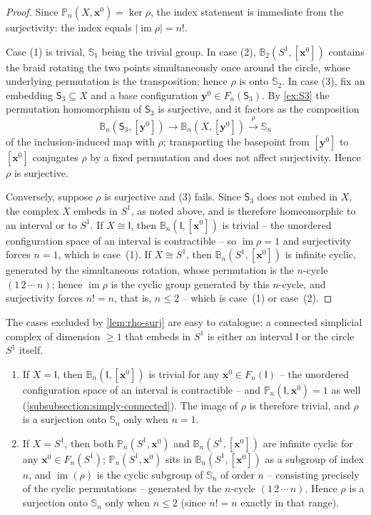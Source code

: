 \documentclass[reqno]{amsart}
\theoremstyle{definition}
\newcommand\bfx{\mathbf{x}}
\newcommand\bfy{\mathbf{y}}
\newcommand\sfS{\mathsf{S}}
\newcommand{\PB}{\mathbb{P}}
\newcommand{\BG}{\mathbb{B}}
\newcommand{\im}{\operatorname{im}}
\newcommand{\base}{\bfx^0}
\numberwithin{equation}{section}
\begin{document}
\begin{proof}
Since \(\PB_n(X,\base)=\ker\rho\), the index statement is
immediate from the surjectivity: the index equals
\(|\im\rho|=n!\).

Case (1) is trivial, \(\mathbb{S}_1\) being the trivial group.
In case (2), \(\BG_2(S^1,[\base])\) contains the braid rotating
the two points simultaneously once around the circle, whose
underlying permutation is the transposition; hence \(\rho\) is
onto \(\mathbb{S}_2\). In case (3), fix an embedding
\(\sfS_3\subseteq X\) and a base configuration
\(\bfy^0\in F_n(\sfS_3)\). By \cref{ex:S3} the permutation
homomorphism of \(\sfS_3\) is surjective, and it factors as the
composition
\[
\BG_n(\sfS_3,[\bfy^0])\longrightarrow\BG_n(X,[\bfy^0])
\xrightarrow{\rho}\mathbb{S}_n
\]
of the inclusion-induced map with \(\rho\); transporting the
basepoint from \([\bfy^0]\) to \([\base]\) conjugates \(\rho\)
by a fixed permutation and does not affect surjectivity. Hence
\(\rho\) is surjective.

Conversely, suppose \(\rho\) is surjective and (3) fails. Since
\(\sfS_3\) does not embed in \(X\), the complex \(X\) embeds in
\(S^1\), as noted above, and is therefore homeomorphic to an
interval or to \(S^1\). If \(X\cong\mathsf{I}\), then
\(\BG_n(\mathsf{I},[\base])\) is trivial -- the unordered
configuration space of an interval is contractible -- so
\(\im\rho=1\) and surjectivity forces \(n=1\), which is
case~(1). If \(X\cong S^1\), then \(\BG_n(S^1,[\base])\) is
infinite cyclic, generated by the simultaneous rotation, whose
permutation is the \(n\)-cycle \((1\,2\,\cdots\,n)\); hence
\(\im\rho\) is the cyclic group generated by this \(n\)-cycle,
and surjectivity forces \(n!=n\), that is, \(n\leq2\) -- which
is case~(1) or case~(2).
\end{proof}

The cases excluded by \cref{lem:rho-surj} are easy to
catalogue: a connected simplicial complex of dimension \(\geq 1\)
that embeds in \(S^1\) is either an interval \(\mathsf{I}\) or the
circle \(S^1\) itself.

\begin{enumerate}
    \item If \(X = \mathsf{I}\), then
    \(\BG_n(\mathsf{I},[\base])\) is trivial for any
    \(\base\in F_n(\mathsf{I})\) -- the unordered configuration
    space of an interval is contractible -- and
    \(\PB_n(\mathsf{I},\base)=1\) as well
    (\cref{subsubsection:simply-connected}). The image of
    \(\rho\) is therefore trivial, and \(\rho\) is a surjection
    onto \(\mathbb{S}_n\) only when \(n = 1\).
    \item If \(X = S^1\), then both \(\PB_n(S^1,\base)\) and \(\BG_n(S^1,[\base])\)
    are infinite cyclic for any \(\base\in F_n(S^1)\); \(\PB_n(S^1,\base)\) sits in \(\BG_n(S^1,[\base])\) as a
    subgroup of index \(n\), and \(\im(\rho)\) is the cyclic
    subgroup of \(\mathbb{S}_n\) of order \(n\) -- consisting precisely
    of the cyclic permutations -- generated by the \(n\)-cycle
    \((1\,2\,\cdots\,n)\). Hence \(\rho\) is a surjection onto
    \(\mathbb{S}_n\) only when \(n\leq 2\) (since \(n! = n\) exactly in
    that range).
\end{enumerate}
\end{document}
